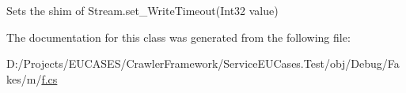 Sets the shim of Stream.\-set\-\_\-\-Write\-Timeout(\-Int32 value)



The documentation for this class was generated from the following file\-:\begin{DoxyCompactItemize}
\item 
D\-:/\-Projects/\-E\-U\-C\-A\-S\-E\-S/\-Crawler\-Framework/\-Service\-E\-U\-Cases.\-Test/obj/\-Debug/\-Fakes/m/\hyperlink{m_2f_8cs}{f.\-cs}\end{DoxyCompactItemize}
